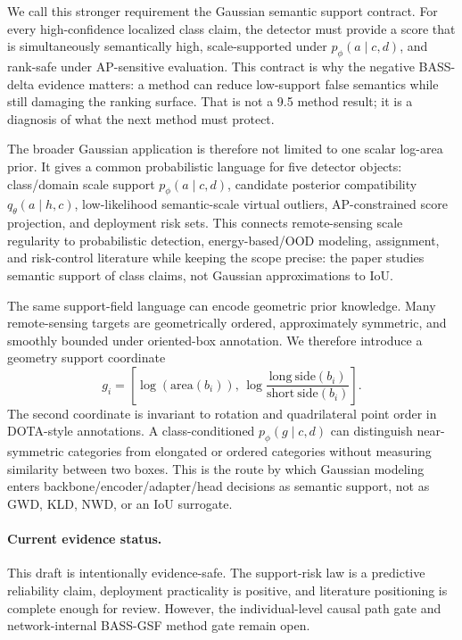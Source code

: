 \documentclass[10pt]{article}
\begin{document}
We call this stronger requirement the Gaussian semantic support contract.  For
every high-confidence localized class claim, the detector must provide a score
that is simultaneously semantically high, scale-supported under
$p_\phi(a\mid c,d)$, and rank-safe under AP-sensitive evaluation.  This
contract is why the negative BASS-delta evidence matters: a method can reduce
low-support false semantics while still damaging the ranking surface.  That is
not a 9.5 method result; it is a diagnosis of what the next method must
protect.

The broader Gaussian application is therefore not limited to one scalar
log-area prior.  It gives a common probabilistic language for five detector
objects: class/domain scale support $p_\phi(a\mid c,d)$, candidate posterior
compatibility $q_\theta(a\mid h,c)$, low-likelihood semantic-scale virtual
outliers, AP-constrained score projection, and deployment risk sets.  This
connects remote-sensing scale regularity to probabilistic detection,
energy-based/OOD modeling, assignment, and risk-control literature while
keeping the scope precise: the paper studies semantic support of class claims,
not Gaussian approximations to IoU.

The same support-field language can encode geometric prior knowledge.  Many
remote-sensing targets are geometrically ordered, approximately symmetric, and
smoothly bounded under oriented-box annotation.  We therefore introduce a
geometry support coordinate
\begin{equation}
  g_i=\left[\log(\mathrm{area}(b_i)),\,
  \log\frac{\mathrm{long\ side}(b_i)}{\mathrm{short\ side}(b_i)}\right].
\end{equation}
The second coordinate is invariant to rotation and quadrilateral point order in
DOTA-style annotations.  A class-conditioned $p_\phi(g\mid c,d)$ can distinguish
near-symmetric categories from elongated or ordered categories without
measuring similarity between two boxes.  This is the route by which Gaussian
modeling enters backbone/encoder/adapter/head decisions as semantic support,
not as GWD, KLD, NWD, or an IoU surrogate.

\paragraph{Current evidence status.}
This draft is intentionally evidence-safe.  The support-risk law is a
predictive reliability claim, deployment practicality is positive, and
literature positioning is complete enough for review.  However, the
individual-level causal path gate and network-internal BASS-GSF method gate
remain open.
\end{document}
